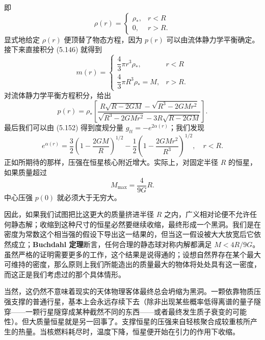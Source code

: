 即
\begin{equation*}
\rho(r) =
\begin{cases}
\rho_*, & r < R\\
0, & r > R.
\end{cases}
\tag{5.156}
\end{equation*}
显式地给定 $\rho(r)$ 便顶替了物态方程，因为 $p(r)$ 可以由流体静力学平衡确定。接下来直接积分 (5.146) 就得到
\begin{equation*}
m(r) =
\begin{cases}
\dfrac{4}{3}\pi r^3\rho_*, & r < R\\[8pt]
\dfrac{4}{3}\pi R^3\rho_* = M, & r > R.
\end{cases}
\tag{5.157}
\end{equation*}
对流体静力学平衡方程积分，给出
\begin{equation*}
p(r) = \rho_*\left[\frac{R\sqrt{R-2GM} - \sqrt{R^3-2GMr^2}}{\sqrt{R^3-2GMr^2} - 3R\sqrt{R-2GM}}\right].
\tag{5.158}
\end{equation*}
最后我们可以由 (5.152) 得到度规分量 $g_{tt} = -e^{2\alpha(r)}$；我们发现
\begin{equation*}
e^{\alpha(r)} = \frac{3}{2}\left(1 - \frac{2GM}{R}\right)^{1/2} - \frac{1}{2}\left(1 - \frac{2GMr^2}{R^3}\right)^{1/2}, \quad r < R.
\tag{5.159}
\end{equation*}
正如所期待的那样，压强在恒星核心附近增大。实际上，对固定半径 $R$ 的恒星，如果质量超过
\begin{equation*}
M_{\mathrm{max}} = \frac{4}{9G}R.
\tag{5.160}
\end{equation*}
中心压强 $p(0)$ 就必须大于无穷大。

因此，如果我们试图把比这更大的质量挤进半径 $R$ 之内，广义相对论便不允许任何静态解；收缩到这种尺寸的恒星必然要继续收缩，最终形成一个黑洞。我们是在密度为常数这个相当强的假设下导出这一结果的，但当这一假设被大大放宽后它依然成立；\textbf{Buchdahl 定理}断言，任何合理的静态球对称内解都满足 $M < 4R/9G$。虽然严格的证明需要更多的工作，这个结果是说得通的；设想自然界存在某个最大可维持的密度，那么原则上我们所能造出的质量最大的物体将处处具有这一密度，而这正是我们考虑过的那个具体情形。

当然，这仍然不意味着现实的天体物理客体最终总会坍缩为黑洞。一颗依靠物质压强支撑的普通行星，基本上会永远存续下去（除非出现某些概率低得离谱的量子隧穿——一颗行星隧穿成某种截然不同的东西——或者最终发生质子衰变的可能性）。但大质量恒星就是另一回事了。支撑恒星的压强来自轻核聚合成较重核所产生的热量。当核燃料耗尽时，温度下降，恒星便开始在引力的作用下收缩。

